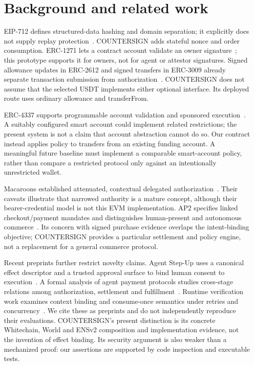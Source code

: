 \documentclass[11pt]{article}
\begin{document}
\section{Background and related work}
EIP-712 defines structured-data hashing and domain separation; it explicitly does not supply replay protection~\cite{eip712}. COUNTERSIGN adds stateful nonce and order consumption. ERC-1271 lets a contract account validate an owner signature~\cite{erc1271}; this prototype supports it for owners, not for agent or attestor signatures. Signed allowance updates in ERC-2612 and signed transfers in ERC-3009 already separate transaction submission from authorization~\cite{erc2612,erc3009}. COUNTERSIGN does not assume that the selected USDT implements either optional interface. Its deployed route uses ordinary allowance and transferFrom.

ERC-4337 supports programmable account validation and sponsored execution~\cite{erc4337}. A suitably configured smart account could implement related restrictions; the present system is not a claim that account abstraction cannot do so. Our contract instead applies policy to transfers from an existing funding account. A meaningful future baseline must implement a comparable smart-account policy, rather than compare a restricted protocol only against an intentionally unrestricted wallet.

Macaroons established attenuated, contextual delegated authorization~\cite{macaroons}. Their caveats illustrate that narrowed authority is a mature concept, although their bearer-credential model is not this EVM implementation. AP2 specifies linked checkout/payment mandates and distinguishes human-present and autonomous commerce~\cite{ap2}. Its concern with signed purchase evidence overlaps the intent-binding objective; COUNTERSIGN provides a particular settlement and policy engine, not a replacement for a general commerce protocol.

Recent preprints further restrict novelty claims. Agent Step-Up uses a canonical effect descriptor and a trusted approval surface to bind human consent to execution~\cite{asu}. A formal analysis of agent payment protocols studies cross-stage relations among authorization, settlement and fulfillment~\cite{agentformal}. Runtime verification work examines context binding and consume-once semantics under retries and concurrency~\cite{runtime}. We cite these as preprints and do not independently reproduce their evaluations. COUNTERSIGN's present distinction is its concrete Whitechain, World and ENSv2 composition and implementation evidence, not the invention of effect binding. Its security argument is also weaker than a mechanized proof: our assertions are supported by code inspection and executable tests.
\end{document}

